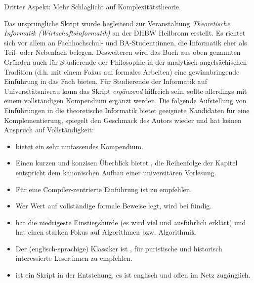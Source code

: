 Dritter Aspekt: Mehr Schlaglicht auf Komplexitätstheorie.

Das ursprüngliche Skript wurde begleitend zur Veranstaltung
\emph{Theoretische Informatik (Wirtschaftsinformatik)}
an der DHBW Heilbronn erstellt.
Es richtet sich vor allem an Fachhochschul- und BA-Student:innen,
die Informatik eher als Teil- oder Nebenfach belegen.
Desweiteren wird das Buch aus oben genannten Gründen auch für Studierende der Philosophie
in der analytisch-angelsächischen Tradition (d.h. mit einem Fokus auf formales Arbeiten)
eine gewinnbringende Einführung in das Fach bieten.
Für Studierende der Informatik auf Universitätsniveau kann das Skript 
\emph{ergänzend} hilfreich sein,
sollte allerdings mit einem vollständigen Kompendium ergänzt werden.
Die folgende Aufstellung von Einführungen in die theoretische Informatik
bietet geeignete Kandidaten für eine Komplementierung, 
spiegelt den Geschmack des Autors wieder
und hat keinen Anspruch auf Vollständigkeit:
\begin{itemize}
    \item  \cite{hoffmann} bietet ein sehr umfassendes Kompendium.
    \item  Einen kurzen und konzisen Überblick bietet \cite{schoening},
            die Reihenfolge der Kapitel entspricht dem kanonischen Aufbau
            einer universitären Vorlesung.
    \item  Für eine Compiler-zentrierte Einführung ist \cite{hedtstueck}
           zu empfehlen.
    \item  Wer Wert auf vollständige formale Beweise legt,
        wird bei \cite{erkpriese} fündig.
    \item  \cite{neubert} hat die niedrigeste Einstiegshürde (es wird viel und ausführlich erklärt) und hat einen starken Fokus auf Algorithmen bzw. Algorithmik.
    \item  Der (englisch-sprachige) Klassiker ist \cite{hopcroftullman},
        für puristische und historisch interessierte Leser:innen zu empfehlen.
    \item  \cite{barak} ist ein Skript in der Entstehung, es ist englisch und offen im Netz zugänglich.
\end{itemize}



